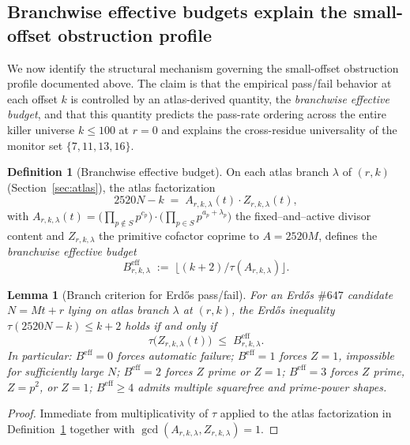 \documentclass[11pt]{article}
\renewcommand{\_}{\origunderscore\allowbreak}
\newtheorem{lemma}[theorem]{Lemma}
\theoremstyle{definition}
\newtheorem{definition}[theorem]{Definition}
\theoremstyle{remark}
\begin{document}
\subsection{Branchwise effective budgets explain the small-offset obstruction profile}\label{subsec:beff_mechanism}

We now identify the structural mechanism governing the small-offset
obstruction profile documented above. The claim is that the empirical
pass/fail behavior at each offset $k$ is controlled by an
atlas-derived quantity, the \emph{branchwise effective budget}, and
that this quantity predicts the pass-rate ordering across the entire
killer universe $k\le 100$ at $r=0$ and explains the cross-residue
universality of the monitor set $\{7,11,13,16\}$.

\begin{definition}[Branchwise effective budget]\label{def:beff}
On each atlas branch $\lambda$ of $(r,k)$ (Section~\ref{sec:atlas}),
the atlas factorization
\[
  2520N - k \;=\; A_{r,k,\lambda}(t)\cdot Z_{r,k,\lambda}(t),
\]
with $A_{r,k,\lambda}(t) = \bigl(\prod_{p\notin S}p^{c_p}\bigr)\cdot\bigl(\prod_{p\in S}p^{a_p+\lambda_p}\bigr)$
the fixed--and--active divisor content and $Z_{r,k,\lambda}$ the
primitive cofactor coprime to $A = 2520M$, defines the
\emph{branchwise effective budget}
\[
  B^{\mathrm{eff}}_{r,k,\lambda}
  \;:=\;
  \bigl\lfloor (k+2)/\tau(A_{r,k,\lambda})\bigr\rfloor.
\]
\end{definition}

\begin{lemma}[Branch criterion for Erd\H{o}s pass/fail]\label{lem:branch_criterion}
For an Erd\H{o}s $\#647$ candidate $N = Mt + r$ lying on atlas branch
$\lambda$ at $(r,k)$, the Erd\H{o}s inequality
$\tau(2520N - k)\le k+2$ holds if and only if
\[
  \tau\bigl(Z_{r,k,\lambda}(t)\bigr) \;\le\; B^{\mathrm{eff}}_{r,k,\lambda}.
\]
In particular: $B^{\mathrm{eff}}=0$ forces automatic failure;
$B^{\mathrm{eff}}=1$ forces $Z=1$, impossible for sufficiently
large $N$; $B^{\mathrm{eff}}=2$ forces $Z$ prime or $Z=1$;
$B^{\mathrm{eff}}=3$ forces $Z$ prime, $Z = p^2$, or $Z=1$;
$B^{\mathrm{eff}}\ge 4$ admits multiple squarefree and prime-power
shapes.
\end{lemma}

\begin{proof}
Immediate from multiplicativity of $\tau$ applied to the atlas
factorization in Definition~\ref{def:beff} together with
$\gcd(A_{r,k,\lambda}, Z_{r,k,\lambda}) = 1$.
\end{proof}
\end{document}

